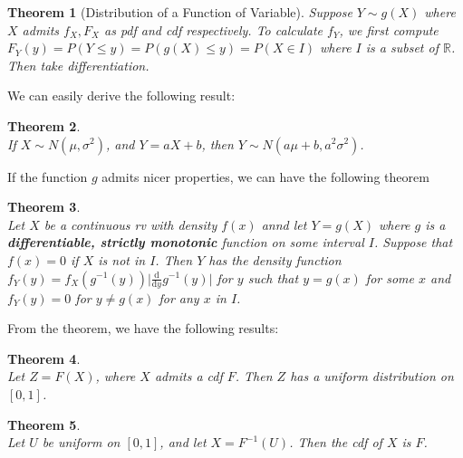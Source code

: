 \documentclass[12pt]{article}
\newcommand{\diff}{\mathrm{d}}
\newtheorem{theorem}{Theorem}[section]
\theoremstyle{definition}
\begin{document}
\begin{theorem}[Distribution of a Function of Variable]
\hfill \normalfont Suppose $Y\sim g(X)$ where $X$ admits $f_X, F_X$ as pdf and cdf respectively. To calculate $f_Y$, we first compute
$
F_Y(y) = P(Y\leq y) = P(g(X)\leq y) = P(X \in I) 
$
where $I$ is a subset of $\mathbb{R}$. Then take differentiation.
\end{theorem}
We can easily derive the following result:
\begin{theorem}
\hfill\\\normalfont If $X\sim N(\mu, \sigma^2)$, and $Y=aX+b$, then $Y\sim N(a\mu+b, a^2\sigma^2)$.
\end{theorem}
If the function $g$ admits nicer properties, we can have the following theorem
\begin{theorem}
\hfill\\\normalfont Let $X$ be a continuous rv with density $f(x)$ annd let $Y = g(X)$ where $g$ is a \textbf{differentiable, strictly monotonic} function on some interval $I$. Suppose that $f(x) = 0$ if $X$ is not in $I$. Then $Y$ has the density function
$
f_Y(y) = f_X(g^{-1}(y))\lvert\frac{\diff}{\diff y} g^{-1}(y)\rvert
$
for $y$ such that $y=g(x)$ for some $x$ and $f_Y(y) = 0$ for $y\neq g(x)$ for any $x$ in $I$. 
\end{theorem}
From the theorem, we have the following results:
\begin{theorem}
\hfill\\\normalfont Let $Z=F(X)$, where $X$ admits a cdf $F$. Then $Z$ has a uniform distribution on $[0,1]$.
\end{theorem}
\begin{theorem}
\hfill\\\normalfont Let $U$ be uniform on $[0,1]$, and let $X=F^{-1}(U)$. Then the cdf of $X$ is $F$.
\end{theorem}
\end{document}
